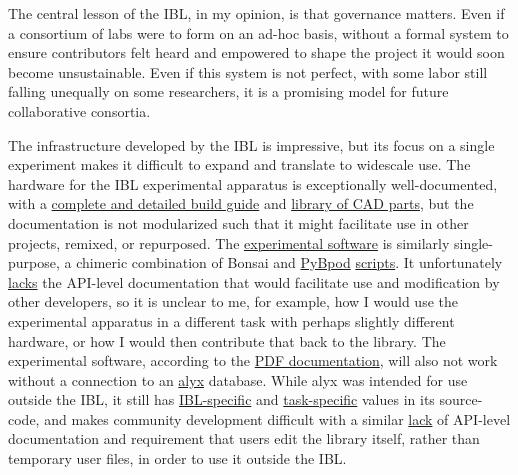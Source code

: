 \documentclass[10pt]{article}
\begin{document}
\begin{multicols}{2}
The central lesson of the IBL, in my opinion, is that governance
matters. Even if a consortium of labs were to form on an ad-hoc basis,
without a formal system to ensure contributors felt heard and empowered
to shape the project it would soon become unsustainable. Even if this
system is not perfect, with some labor still falling unequally on some
researchers, it is a promising model for future collaborative consortia.

The infrastructure developed by the IBL is impressive, but its focus on
a single experiment makes it difficult to expand and translate to
widescale use. The hardware for the IBL experimental apparatus is
exceptionally well-documented, with a
\href{https://figshare.com/articles/preprint/A_standardized_and_reproducible_method_to_measure_decision-making_in_mice_Appendix_3_IBL_protocol_for_setting_up_the_behavioral_training_rig/11634732}{complete
and detailed build guide} and
\href{https://figshare.com/articles/online_resource/A_standardized_and_reproducible_method_to_measure_decision-making_in_mice_CAD_files_for_behavior_rig/11639973}{library
of CAD parts}, but the documentation is not modularized such that it
might facilitate use in other projects, remixed, or repurposed. The
\href{https://github.com/int-brain-lab/iblrig}{experimental software} is
similarly single-purpose, a chimeric combination of Bonsai \cite{lopesBonsaiEventbasedFramework2015}  and
\href{https://github.com/pybpod/pybpod}{PyBpod}
\href{https://github.com/int-brain-lab/iblrig/tree/master/tasks/_iblrig_tasks_ephysChoiceWorld}{scripts}.
It unfortunately
\href{https://iblrig.readthedocs.io/en/latest/index.html}{lacks} the
API-level documentation that would facilitate use and modification by
other developers, so it is unclear to me, for example, how I would use
the experimental apparatus in a different task with perhaps slightly
different hardware, or how I would then contribute that back to the
library. The experimental software, according to the
\href{https://figshare.com/articles/preprint/A_standardized_and_reproducible_method_to_measure_decision-making_in_mice_Appendix_3_IBL_protocol_for_setting_up_the_behavioral_training_rig/11634732}{PDF
documentation}, will also not work without a connection to an
\href{https://github.com/cortex-lab/alyx}{alyx} database. While alyx was
intended for use outside the IBL, it still has
\href{https://github.com/cortex-lab/alyx/blob/07f481f6bbde668b81ad2634f4c42df4d6a74e44/alyx/data/management/commands/files.py\#L188}{IBL-specific}
and
\href{https://github.com/cortex-lab/alyx/blob/07f481f6bbde668b81ad2634f4c42df4d6a74e44/alyx/data/fixtures/data.datasettype.json\#L29}{task-specific}
values in its source-code, and makes community development difficult
with a similar \href{https://alyx.readthedocs.io/en/latest/}{lack} of
API-level documentation and requirement that users edit the library
itself, rather than temporary user files, in order to use it outside the
IBL.


\end{multicols}
\end{document}
